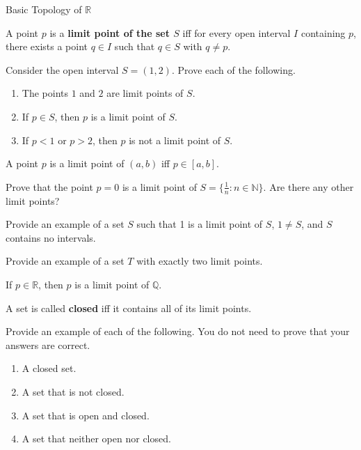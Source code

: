 \begin{section}{Basic Topology of $\mathbb{R}$}
\begin{definition}
A point $p$ is a \textbf{limit point of the set $S$} iff for every open interval $I$ containing $p$, there exists a point $q \in I$ such that $q \in S$ with $q\neq p$.
\end{definition}

\begin{problem}
Consider the open interval $S=(1,2)$. Prove each of the following.
\begin{enumerate}
\item The points $1$ and $2$ are limit points of $S$.
\item If $p\in S$, then $p$ is a limit point of $S$.
\item If $p<1$ or $p>2$, then $p$ is not a limit point of $S$.
\end{enumerate}
\end{problem}

\begin{theorem}[*]
A point $p$ is a limit point of $(a,b)$ iff $p\in [a,b]$.
\end{theorem}

\begin{problem}
Prove that the point $p=0$ is a limit point of $S=\{\frac{1}{n}: n \in \mathbb{N}\}$.  Are there any other limit points?
\end{problem}

\begin{exercise}
Provide an example of a set $S$ such that 1 is a limit point of $S$, $1\neq S$, and $S$ contains no intervals.
\end{exercise}

\begin{exercise}
Provide an example of a set $T$ with exactly two limit points.
\end{exercise}

\begin{theorem}
If $p\in\mathbb{R}$, then $p$ is a limit point of $\mathbb{Q}$.
\end{theorem}

\begin{definition}
A set is called \textbf{closed} iff it contains all of its limit points.
\end{definition}

\begin{exercise}
Provide an example of each of the following.  You do not need to prove that your answers are correct.
\begin{enumerate}
\item A closed set.
\item A set that is not closed.
\item A set that is open and closed.
\item A set that neither open nor closed.
\end{enumerate}


\end{exercise}
\end{section}
